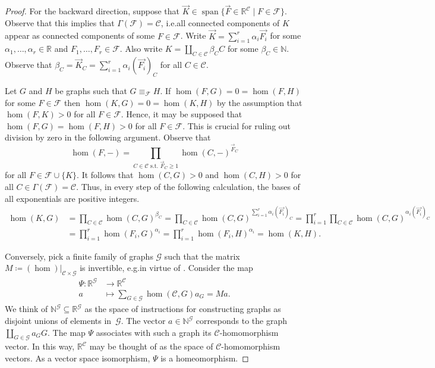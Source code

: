 \documentclass[3p,final]{elsarticle}
\DeclareMathOperator{\spn}{span}
\begin{document}
	\begin{proof}
		For the backward direction, suppose that $\vec{K} \in \spn \{\vec{F} \in \mathbb{R}^{\mathcal{C}} \mid F \in \mathcal{F}\}$. 
		Observe that this implies that $\Gamma(\mathcal{F}) = \mathcal{C}$, i.e.\@ all connected components of $K$ appear as connected components of some $F \in \mathcal{F}$.
		Write $\vec{K} = \sum_{i=1}^r \alpha_i \vec{F_i}$ for some $\alpha_1, \dots, \alpha_r \in \mathbb{R}$ and $F_1, \dots, F_r \in \mathcal{F}$.
		Also write $K = \coprod_{C \in \mathcal{C}} \beta_C C$ for some $\beta_C \in \mathbb{N}$.
		Observe that $\beta_C = \vec{K}_C = \sum_{i=1}^r \alpha_i (\vec{F_i})_C$ for all $C \in \mathcal{C}$.
		
		Let $G$ and $H$ be graphs such that $G \equiv_{\mathcal{F}} H$. If $\hom(F, G) = 0 = \hom(F, H)$ for some $F \in \mathcal{F}$ then $\hom(K, G) = 0 = \hom(K, H)$ by the assumption that $\hom(F, K) > 0$ for all $F \in \mathcal{F}$. 
		Hence, it may be supposed that $\hom(F, G) = \hom(F, H) > 0$ for all $F \in \mathcal{F}$.
		This is crucial for ruling out division by zero in the following argument.
		Observe that
		\[
		\hom(F, -) = \prod_{C \in \mathcal{C} \text{ s.t. } \vec{F}_C \geq 1} \hom(C, -)^{\vec{F}_C}
		\]
		for all $F \in \mathcal{F} \cup \{K\}$. 
		It follows that $\hom(C, G) > 0$ and $\hom(C, H) > 0$ for all $C \in \Gamma(\mathcal{F}) = \mathcal{C}$. 
		Thus, in every step of the following calculation, the bases of all exponentials are positive integers.
		\begin{align*}
			\hom(K, G) 
			&= \prod_{C \in \mathcal{C}} \hom(C, G)^{\beta_C}
			= \prod_{C \in \mathcal{C}} \hom(C, G)^{\sum_{i=1}^r \alpha_i (\vec{F_i})_C}
			= \prod_{i=1}^r \prod_{C \in \mathcal{C}}  \hom(C, G)^{\alpha_i(\vec{F_i})_C} \\
			&= \prod_{i=1}^r \hom(F_i, G)^{\alpha_i}
			= \prod_{i=1}^r \hom(F_i, H)^{\alpha_i}
			= \hom(K, H).
		\end{align*}
		
		Conversely, pick a finite family of graphs $\mathcal{G}$ such that the matrix $M \coloneqq (\hom)|_{\mathcal{C} \times \mathcal{G}}$ is invertible, e.g.\@ in virtue of \cite[Proposition~5.44(b)]{lovasz_large_2012}. Consider the map
		\begin{align*}
			\Psi \colon \mathbb{R}^{\mathcal{G}} & \to \mathbb{R}^{\mathcal{C}} \\
			a &\mapsto \sum_{G \in \mathcal{G}} \hom(\mathcal{C}, G) a_G = M a.
		\end{align*}
		We think of $\mathbb{N}^{\mathcal{G}} \subseteq \mathbb{R}^{\mathcal{G}}$ as the space of instructions for constructing graphs as disjoint unions of elements in~$\mathcal{G}$. The vector $a \in \mathbb{N}^{\mathcal{G}}$ corresponds to the graph $\coprod_{G \in \mathcal{G}} a_G G$.
		The map $\Psi$ associates with such a graph its $\mathcal{C}$-homomorphism vector. In this way, $\mathbb{R}^{\mathcal{C}}$ may be thought of as the space of $\mathcal{C}$-homomorphism vectors.
		As a vector space isomorphism, $\Psi$ is a homeomorphism.
		

\end{proof}
\end{document}
